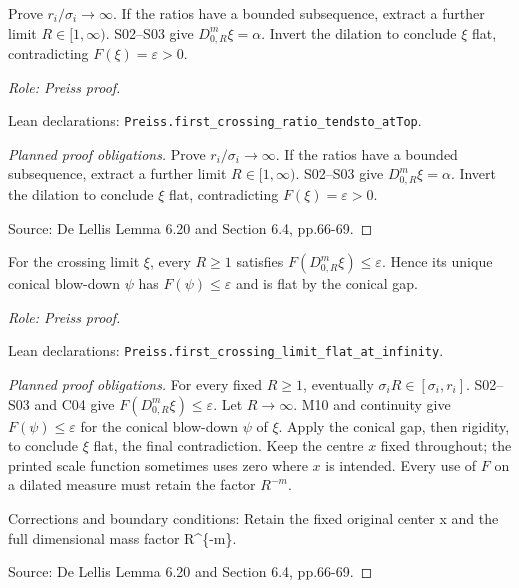 \begin{lemma}
\label{lem:first-crossing-ratio}




Prove $r_i/\sigma_i\to\infty$. If the ratios have a bounded subsequence,
extract a further limit $R\in[1,\infty)$. S02--S03 give
$D^m_{0,R}\xi=\alpha$. Invert the dilation to conclude $\xi$ flat,
contradicting $F(\xi)=\varepsilon>0$.
\par\emph{Role: Preiss proof.}
\par Lean declarations: \texttt{Preiss.first\_crossing\_ratio\_tendsto\_atTop}.
\end{lemma}
\begin{proof}[Planned proof obligations]

Prove $r_i/\sigma_i\to\infty$. If the ratios have a bounded subsequence,
extract a further limit $R\in[1,\infty)$. S02--S03 give
$D^m_{0,R}\xi=\alpha$. Invert the dilation to conclude $\xi$ flat,
contradicting $F(\xi)=\varepsilon>0$.
\par Source: De Lellis Lemma 6.20 and Section 6.4, pp.66-69.
\end{proof}

\begin{lemma}
\label{lem:first-crossing-flat-infinity}




For the crossing limit $\xi$, every $R\geq1$ satisfies $F(D^m_{0,R}\xi)\leq\varepsilon$. Hence its unique conical blow-down $\psi$ has $F(\psi)\leq\varepsilon$ and is flat by the conical gap.
\par\emph{Role: Preiss proof.}
\par Lean declarations: \texttt{Preiss.first\_crossing\_limit\_flat\_at\_infinity}.
\end{lemma}
\begin{proof}[Planned proof obligations]

For every fixed $R\geq1$, eventually $\sigma_i R\in[\sigma_i,r_i]$.
S02--S03 and C04 give $F(D^m_{0,R}\xi)\leq\varepsilon$.
Let $R\to\infty$. M10 and continuity give $F(\psi)\leq\varepsilon$ for
the conical blow-down $\psi$ of $\xi$. Apply the conical gap, then rigidity,
to conclude $\xi$ flat, the final contradiction.
Keep the centre $x$ fixed throughout; the printed scale function sometimes
uses zero where $x$ is intended. Every use of $F$ on a dilated measure must
retain the factor $R^{-m}$.
\par Corrections and boundary conditions: Retain the fixed original center x and the full dimensional mass factor R\textasciicircum{}\{-m\}.
\par Source: De Lellis Lemma 6.20 and Section 6.4, pp.66-69.
\end{proof}

